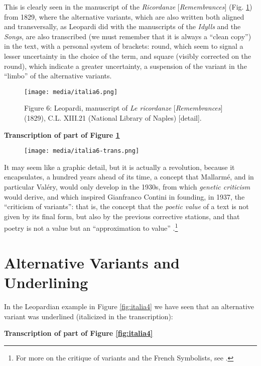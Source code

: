 \documentclass{article}
\begin{document}
This is clearly seen in the manuscript of the \emph{Ricordanze}
[\emph{Remembrances}] (Fig. \ref{fig:italia6}) from 1829, where the alternative
variants, which are also written both aligned and transversally, as
Leopardi did with the manuscripts of the \emph{Idylls} and the
\emph{Songs}, are also transcribed (we must remember that it is always a
``clean copy'') in the text, with a personal system of brackets: round,
which seem to signal a lesser uncertainty in the choice of the term, and
square (visibly corrected on the round), which indicate a greater
uncertainty, a suspension of the variant in the ``limbo'' of the
alternative variants.

\begin{figure}[H]
    \centering
    \texttt{[image: media/italia6.png]}
    \caption{Figure 6: Leopardi, manuscript of \emph{Le ricordanze}
[\emph{Remembrances}] (1829), C.L. XIII.21 (National Library of Naples)
[detail].}
    \label{fig:italia6}
\end{figure}

\textbf{Transcription of part of Figure \ref{fig:italia6}}

\begin{figure}
    \centering
    \texttt{[image: media/italia6-trans.png]}
\end{figure}


It may seem like a graphic detail, but it is actually a revolution, because
it encapsulates, a hundred years ahead of its time, a concept that
Mallarmé, and in particular Valéry, would only develop in the 1930s,
from which \emph{genetic criticism} would derive, and which inspired
Gianfranco Contini in founding, in 1937, the ``criticism of variants'':
that is, the concept that the \emph{poetic value} of a text is not given
by its final form, but also by the previous corrective stations, and
that poetry is not a value but an ``approximation to value'' \parencite[233]{contini_esercizi_1974}.\footnote{For more on the critique of variants and the French Symbolists, see \cite{italia_aux_2019}.}

\section{Alternative Variants and Underlining}

In the Leopardian example in Figure \ref{fig:italia4} we have seen that an alternative variant was underlined (italicized in the transcription):

\textbf{Transcription of part of Figure \ref{fig:italia4}}
\end{document}
